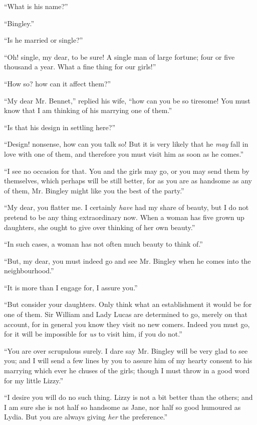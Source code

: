 “What is his name?”

“Bingley.”

“Is he married or single?”

“Oh! single, my dear, to be sure! A single man of
large fortune; four or five thousand a year. What a fine
thing for our girls!”

“How so? how can it affect them?”

“My dear Mr. Bennet,” replied his wife, “how can you
be so tiresome! You must know that I am thinking of his
marrying one of them.”

“Is that his design in settling here?”

“Design! nonsense, how can you talk so! But it is
very likely that he \textit{may} fall in love with one of them, and
therefore you must visit him as soon as he comes.”

“I see no occasion for that. You and the girls may go,
or you may send them by themselves, which perhaps will
be still better, for as you are as handsome as any of them,
Mr. Bingley might like you the best of the party.”

“My dear, you flatter me. I certainly \textit{have} had my
share of beauty, but I do not pretend to be any thing
extraordinary now. When a woman has five grown up daughters,
she ought to give over thinking of her own beauty.”

“In such cases, a woman has not often much beauty
to think of.”

“But, my dear, you must indeed go and see Mr. Bingley
when he comes into the neighbourhood.”

“It is more than I engage for, I assure you.”

“But consider your daughters. Only think what an
establishment it would be for one of them. Sir William
and Lady Lucas are determined to go, merely on that
account, for in general you know they visit no new comers.
Indeed you must go, for it will be impossible for \textit{us} to
visit him, if you do not.”

“You are over scrupulous surely. I dare say Mr.
Bingley will be very glad to see you; and I will send
a few lines by you to assure him of my hearty consent
to his marrying which ever he chuses of the girls; though
I must throw in a good word for my little Lizzy.”

“I desire you will do no such thing. Lizzy is not
a bit better than the others; and I am sure she is not half
so handsome as Jane, nor half so good humoured as Lydia.
But you are always giving \textit{her} the preference.”

